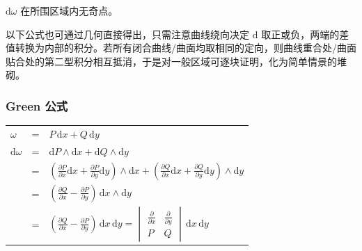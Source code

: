 \documentclass[12pt, a4paper, UTF8, openany]{ctexbook}
\newcommand{\dif}{\mathrm{d}}
\newcommand{\sdif}{\,\dif}
\begin{document}
        $\dif\omega$ 在所围区域内{\heiti 无奇点}。

        以下公式也可通过几何直接得出，只需注意曲线绕向决定 $\dif$ 取正或负，两端的差值转换为内部的积分。若所有闭合曲线/曲面均取相同的定向，则曲线重合处/曲面贴合处的第二型积分相互抵消，于是对一般区域可逐块证明，化为简单情景的堆砌。

        \subsubsection{Green 公式}
        {\begin{longtable}[h]{l l l}
            $\omega$ & = & $P\sdif x + Q\sdif y$ \\
            \addlinespace
            $\dif \omega$ & = & $\dif P \land \dif x + \dif Q \land \dif y$ \\
            \addlinespace
            & = & $(\frac{\partial P}{\partial x}\dif x + \frac{\partial P}{\partial y}\dif y) \land \dif x + (\frac{\partial Q}{\partial x}\dif x + \frac{\partial Q}{\partial y}\dif y) \land \dif y$ \\
            \addlinespace
            & = & $(\frac{\partial Q}{\partial x} - \frac{\partial P}{\partial y}) \sdif x \land \dif y$ \\
            \addlinespace
            & = & $\boxed{(\frac{\partial Q}{\partial x} - \frac{\partial P}{\partial y}) \sdif x \sdif y} = 
            \begin{vmatrix}
                \frac{\partial}{\partial x} & \frac{\partial}{\partial y} \\
                P & Q
            \end{vmatrix} \sdif x \sdif y$
        \end{longtable}}
\end{document}
